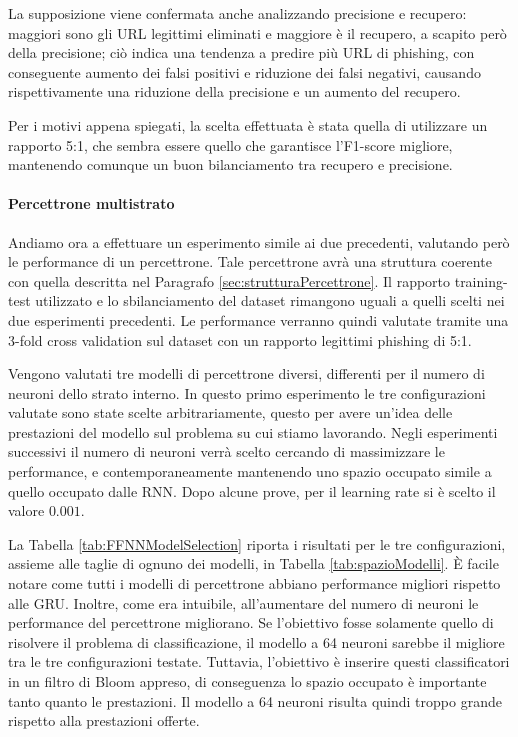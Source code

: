 \documentclass[../../main.tex]{subfiles}
\begin{document}
    La supposizione viene confermata anche analizzando precisione e recupero: maggiori sono gli URL legittimi eliminati e maggiore è il recupero, a scapito però della precisione; ciò indica una tendenza a predire più URL di phishing, con conseguente aumento dei falsi positivi e riduzione dei falsi negativi, causando rispettivamente una riduzione della precisione e un aumento del recupero.

    Per i motivi appena spiegati, la scelta effettuata è stata quella di utilizzare un rapporto 5:1, che sembra essere quello che garantisce l'F1-score migliore, mantenendo comunque un buon bilanciamento tra recupero e precisione.

    \paragraph{Percettrone multistrato}

    Andiamo ora a effettuare un esperimento simile ai due precedenti, valutando però le performance di un percettrone. Tale percettrone avrà una struttura coerente con quella descritta nel Paragrafo \ref{sec:strutturaPercettrone}. Il rapporto training-test utilizzato e lo sbilanciamento del dataset rimangono uguali a quelli scelti nei due esperimenti precedenti. Le performance verranno quindi valutate tramite una 3-fold cross validation sul dataset con un rapporto legittimi phishing di 5:1.

    Vengono valutati tre modelli di percettrone diversi, differenti per il numero di neuroni dello strato interno. In questo primo esperimento le tre configurazioni valutate sono state scelte arbitrariamente, questo per avere un'idea delle prestazioni del modello sul problema su cui stiamo lavorando. Negli esperimenti successivi il numero di neuroni verrà scelto cercando di massimizzare le performance, e contemporaneamente mantenendo uno spazio occupato simile a quello occupato dalle RNN. Dopo alcune prove, per il learning rate si è scelto il valore $0.001$.

    La Tabella \ref{tab:FFNNModelSelection} riporta i risultati per le tre configurazioni, assieme alle taglie di ognuno dei modelli, in Tabella \ref{tab:spazioModelli}. È facile notare come tutti i modelli di percettrone abbiano performance migliori rispetto alle GRU. Inoltre, come era intuibile, all'aumentare del numero di neuroni le performance del percettrone migliorano. Se l'obiettivo fosse solamente quello di risolvere il problema di classificazione, il modello a 64 neuroni sarebbe il migliore tra le tre configurazioni testate. Tuttavia, l'obiettivo è inserire questi classificatori in un filtro di Bloom appreso, di conseguenza lo spazio occupato è importante tanto quanto le prestazioni. Il modello a 64 neuroni risulta quindi troppo grande rispetto alla prestazioni offerte.
    
\end{document}
